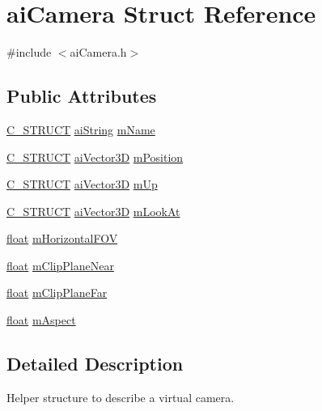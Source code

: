 \hypertarget{structai_camera}{\section{ai\-Camera Struct Reference}
\label{structai_camera}
}


{\ttfamily \#include $<$ai\-Camera.\-h$>$}

\subsection*{Public Attributes}
\begin{DoxyCompactItemize}
\item 
\hyperlink{ai_defines_8h_ab51df4230ceb602bbc1bc109c432a6a0}{C\-\_\-\-S\-T\-R\-U\-C\-T} \hyperlink{structai_string}{ai\-String} \hyperlink{structai_camera_aa6a5fe5e04b3db1b23f69eb9910c6816}{m\-Name}
\item 
\hyperlink{ai_defines_8h_ab51df4230ceb602bbc1bc109c432a6a0}{C\-\_\-\-S\-T\-R\-U\-C\-T} \hyperlink{structai_vector3_d}{ai\-Vector3\-D} \hyperlink{structai_camera_a518617ea192ca0698e748a4399e7c3a5}{m\-Position}
\item 
\hyperlink{ai_defines_8h_ab51df4230ceb602bbc1bc109c432a6a0}{C\-\_\-\-S\-T\-R\-U\-C\-T} \hyperlink{structai_vector3_d}{ai\-Vector3\-D} \hyperlink{structai_camera_a7fb42b287389b4f99c883098268d6d1a}{m\-Up}
\item 
\hyperlink{ai_defines_8h_ab51df4230ceb602bbc1bc109c432a6a0}{C\-\_\-\-S\-T\-R\-U\-C\-T} \hyperlink{structai_vector3_d}{ai\-Vector3\-D} \hyperlink{structai_camera_af9463249ac870e030fa435b1186cef23}{m\-Look\-At}
\item 
\hyperlink{fmod_8h_aeb841aa4b4b5f444b5d739d865b420af}{float} \hyperlink{structai_camera_adcdea73ece19ea0a9068f5544ec23592}{m\-Horizontal\-F\-O\-V}
\item 
\hyperlink{fmod_8h_aeb841aa4b4b5f444b5d739d865b420af}{float} \hyperlink{structai_camera_a720e8c94c036dcefe4b13cc1c69c521e}{m\-Clip\-Plane\-Near}
\item 
\hyperlink{fmod_8h_aeb841aa4b4b5f444b5d739d865b420af}{float} \hyperlink{structai_camera_aa9ccf77e3d7ca3dc8f46df931b65172f}{m\-Clip\-Plane\-Far}
\item 
\hyperlink{fmod_8h_aeb841aa4b4b5f444b5d739d865b420af}{float} \hyperlink{structai_camera_ae414556eaa6f910b5927f465d97bf70c}{m\-Aspect}
\end{DoxyCompactItemize}


\subsection{Detailed Description}
Helper structure to describe a virtual camera.

